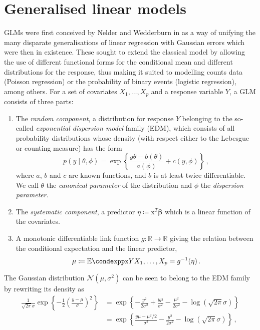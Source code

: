 \documentclass[a4paper]{book}
\begin{document}


\section{Generalised linear models} \label{sec:glm}

GLMs were first conceived by Nelder and Wedderburn in \cite{nelder} as a way of unifying the many disparate generalisations of linear regression with Gaussian errors which were then in existence. These sought to extend the classical model by allowing the use of different functional forms for the conditional mean and different distributions for the response, thus making it suited to modelling counts data (Poisson regression) or the probability of binary events (logistic regression), among others. For a set of covariates $X_1, \dots, X_p$ and a response variable $Y$, a GLM consists of three parts:
\begin{enumerate}
  \item The \emph{random component}, a distribution for response $Y$ belonging to the so-called \emph{exponential dispersion model} family (EDM), which consists of all probability distributions whose density (with respect either to the Lebesgue or counting measure) has the form
  \begin{equation} \label{eq:exp-disp-fam}
    p(y \mid \theta, \phi) = \exp \left \{ \frac{y \theta - b(\theta)}{a(\phi)} + c(y, \phi) \right \} \,,
  \end{equation}
  where $a$, $b$ and $c$ are known functions, and $b$ is at least twice differentiable. We call $\theta$ the \emph{canonical parameter} of the distribution and $\phi$ the \emph{dispersion parameter}.
  \item The \emph{systematic component}, a predictor $\eta \coloneqq \bm{\mathrm{x}}^T \bm{\beta}$ which is a linear function of the covariates.
  \item A monotonic differentiable link function $g: \mathbb{R} \rightarrow \mathbb{R}$ giving the relation between the conditional expectation and the linear predictor,
  \begin{equation}
    \mu \coloneqq \condexpp{Y}{X_1, \dots, X_p} = g^{-1}(\eta) \,.
  \end{equation}
\end{enumerate}
The Gaussian distribution $\mathcal{N}(\mu, \sigma^2)$ can be seen to belong to the EDM family by rewriting its density as
\begin{align}
  \frac{1}{\sqrt{2 \pi} \sigma} \exp \left \{ -\frac{1}{2} \left( \frac{y - \mu}{\sigma} \right)^2\right \} &= \exp \left \{ -\frac{y^2}{2 \sigma^2} + \frac{y \mu}{\sigma^2} - \frac{\mu^2}{2 \sigma^2} - \log(\sqrt{2 \pi} \sigma) \right \} \\
  &= \exp \left \{ \frac{y \mu - \mu^2 / 2}{\sigma^2} - \frac{y^2}{2 \sigma^2} - \log(\sqrt{2 \pi} \sigma) \right \} \,,
\end{align}
\end{document}

